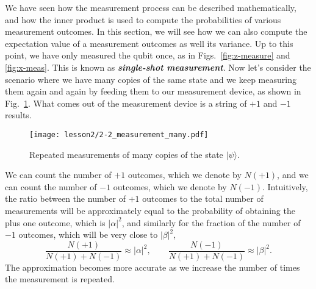 We have seen how the measurement process can be described mathematically, and how the inner product is used to compute the probabilities of various measurement outcomes.
In this section, we will see how we can also compute the expectation value of a measurement outcomes as well its variance.
Up to this point, we have only measured the qubit once, as in Figs.~\ref{fig:z-measure} and \ref{fig:x-meas}.
This is known as \textbf{\emph{single-shot measurement}}.
Now let's consider the scenario where we have many copies of the same state \ket{\psi} and we keep measuring them again and again by feeding them to our measurement device, as shown in Fig.~\ref{fig:many-copies}. What comes out of the measurement device is a string of $+1$ and $-1$ results.
\begin{figure}[H]
    \centering
    \texttt{[image: lesson2/2-2\_measurement\_many.pdf]}
    \caption[Repeated measurements.]{Repeated measurements of many copies of the state $|\psi\rangle$.}
    \label{fig:many-copies}
\end{figure}

We can count the number of $+1$ outcomes, which we denote by $N(+1)$, and we can count the number of $-1$ outcomes, which we denote by $N(-1)$. Intuitively, the ratio between the number of $+1$ outcomes to the total number of measurements will be approximately equal to the probability of obtaining the plus one outcome, which is $|\alpha|^2$, and similarly for the fraction of the number of $-1$ outcomes, which will be very close to $|\beta|^2$,
\begin{equation}
    \frac{N(+1)}{N(+1)+N(-1)} \approx|\alpha|^{2}, \qquad \frac{N(-1)}{N(+1)+N(-1)} \approx|\beta|^{2}.
\end{equation}
The approximation becomes more accurate as we increase the number of times the measurement is repeated.

